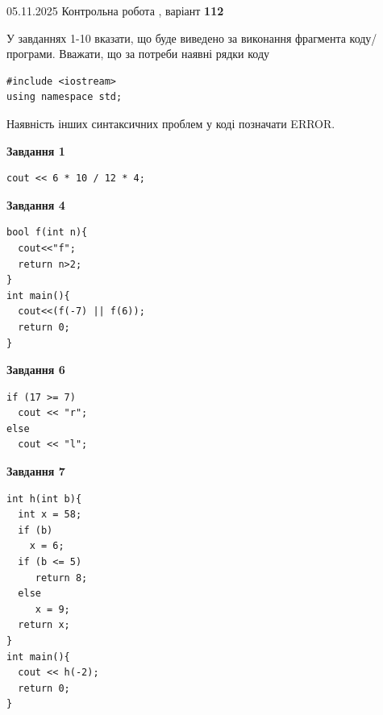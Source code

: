 \documentclass[12pt, ukrainian]{article}
\begin{document}
{\Large{05.11.2025 Контрольна робота , варіант  \No \textbf { 112 }\par}}
{
\begin {large}
У завданнях 1-10 вказати, що буде виведено за виконання фрагмента коду/про\-гра\-ми.
Вважати, що за потреби наявні рядки коду
\begin{verbatim}
#include <iostream>
using namespace std;
\end{verbatim}
Наявність інших синтаксичних проблем у коді позначати ERROR.

\begin{minipage}[t]{7.0cm}

\begin{center}
\textbf{Завдання 1}
\end{center}
\vspace{-8mm}

\begin{verbatim}
cout << 6 * 10 / 12 * 4;
\end{verbatim}



\begin{center}
\textbf{Завдання 4}
\end{center}
\vspace{-8mm}

\begin{verbatim}
bool f(int n){
  cout<<"f";
  return n>2;
}
int main(){
  cout<<(f(-7) || f(6));
  return 0;
}
\end{verbatim}



\begin{center}
\textbf{Завдання 6}
\end{center}
\vspace{-8mm}

\begin{verbatim}
if (17 >= 7)
  cout << "r";
else
  cout << "l";
\end{verbatim}



\begin{center}
\textbf{Завдання 7}
\end{center}
\vspace{-8mm}

\begin{verbatim}
int h(int b){
  int x = 58;
  if (b)
    x = 6;
  if (b <= 5)
     return 8;
  else
     x = 9;
  return x;
}
int main(){
  cout << h(-2);
  return 0;
}
\end{verbatim}


\end{minipage}
\end{large}}
\end{document}

